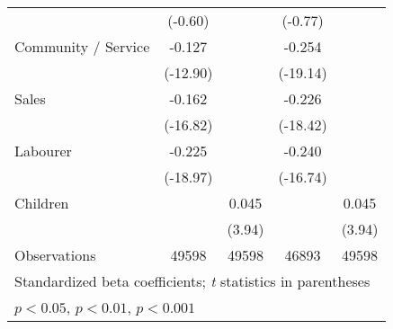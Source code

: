 {\begin{tabular}{l*{4}{c}}
                    &     (-0.60)         &                     &     (-0.77)         &                     \\
[1em]
Community / Service &      -0.127\sym{***}&                     &      -0.254\sym{***}&                     \\
                    &    (-12.90)         &                     &    (-19.14)         &                     \\
[1em]
Sales               &      -0.162\sym{***}&                     &      -0.226\sym{***}&                     \\
                    &    (-16.82)         &                     &    (-18.42)         &                     \\
[1em]
Labourer            &      -0.225\sym{***}&                     &      -0.240\sym{***}&                     \\
                    &    (-18.97)         &                     &    (-16.74)         &                     \\
[1em]
Children            &                     &       0.045\sym{***}&                     &       0.045\sym{***}\\
                    &                     &      (3.94)         &                     &      (3.94)         \\
\hline
Observations        &       49598         &       49598         &       46893         &       49598         \\
\hline\hline
\multicolumn{5}{l}{\footnotesize Standardized beta coefficients; \textit{t} statistics in parentheses}\\
\multicolumn{5}{l}{\footnotesize \sym{*} \(p<0.05\), \sym{**} \(p<0.01\), \sym{***} \(p<0.001\)}\\
\end{tabular}
}
